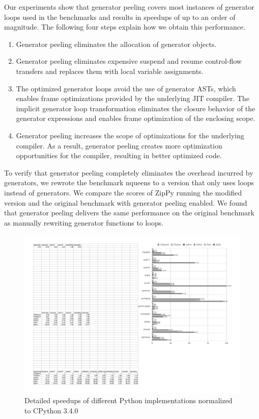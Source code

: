 Our experiments show that generator peeling covers most instances of generator loops used in the benchmarks and results in speedups of up to an order of magnitude.
The following four steps explain how we obtain this performance.

\begin{enumerate}
\item Generator peeling eliminates the allocation of generator objects.
\item Generator peeling eliminates expensive suspend and resume control-flow transfers and replaces them with local variable assignments.
\item The optimized generator loops avoid the use of generator ASTs, which enables frame optimizations provided by the underlying JIT compiler.
The implicit generator loop transformation eliminates the closure behavior of the generator expressions and enables frame optimization of the enclosing scope.

\item Generator peeling increases the scope of optimizations for the underlying compiler.
As a result, generator peeling creates more optimization opportunities for the compiler, resulting in better optimized code.
\end{enumerate}

To verify that generator peeling completely eliminates the overhead incurred by generators, we rewrote the benchmark \textsf{nqueens} to a version that only uses loops instead of generators.
We compare the scores of ZipPy running the modified version and the original benchmark with generator peeling enabled.
We found that generator peeling delivers the same performance on the original benchmark as manually rewriting generator functions to loops.

\begin{figure}
\centering
\includegraphics[scale=.58, page=2]{benchmarks/generator-peeling-benchmark-chart}
\caption{Detailed speedups of different Python implementations normalized to CPython 3.4.0}
\label{fig:ch6-generator-benchmark-zippy-speedup}
\end{figure}

